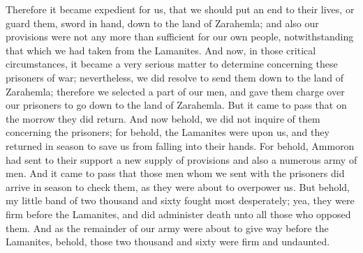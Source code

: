 Therefore it became expedient for us, that we should put an end to their lives, or guard them, sword in hand, down to the land of Zarahemla; and also our provisions were not any more than sufficient for our own people, notwithstanding that which we had taken from the Lamanites.
\bverse \iffalse And now, in those critical circumstances, it became a very serious matter to determine concerning these prisoners of war; nevertheless, we did resolve to send them down to the land of Zarahemla; therefore we selected a part of our men, and gave them charge over our prisoners to go down to the land of Zarahemla. \fi
And now, in those critical circumstances, it became a very serious matter to determine concerning these prisoners of war; nevertheless, we did resolve to send them down to the land of Zarahemla; therefore we selected a part of our men, and gave them charge over our prisoners to go down to the land of Zarahemla.
\bverse \iffalse But it came to pass that on the morrow they did return. And now behold, we did not inquire of them concerning the prisoners; for behold, the Lamanites were upon us, and they returned in season to save us from falling into their hands. For behold, Ammoron had sent to their support a new supply of provisions and also a numerous army of men. \fi
But it came to pass that on the morrow they did return. And now behold, we did not inquire of them concerning the prisoners; for behold, the Lamanites were upon us, and they returned in season to save us from falling into their hands. For behold, Ammoron had sent to their support a new supply of provisions and also a numerous army of men.
\bverse \iffalse And it came to pass that those men whom we sent with the prisoners did arrive in season to check them, as they were about to overpower us. \fi
And it came to pass that those men whom we sent with the prisoners did arrive in season to check them, as they were about to overpower us.
\bverse \iffalse But behold, my little band of two thousand and sixty fought most desperately; yea, they were firm before the Lamanites, and did administer death unto all those who opposed them. \fi
But behold, my little band of two thousand and sixty fought most desperately; yea, they were firm before the Lamanites, and did administer death unto all those who opposed them.
\bverse \iffalse And as the remainder of our army were about to give way before the Lamanites, behold, those two thousand and sixty were firm and undaunted. \fi
And as the remainder of our army were about to give way before the Lamanites, behold, those two thousand and sixty were firm and undaunted.
